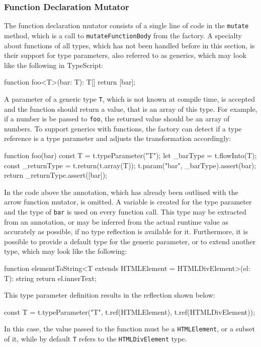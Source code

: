 \subsubsection{Function Declaration Mutator}

The function declaration mutator consists of a single line of code in the \texttt{mutate} method, which is a call to \texttt{mutateFunctionBody} from the factory. A specialty about functions of all types, which has not been handled before in this section, is their support for type parameters, also referred to as generics, which may look like the following in TypeScript:
\begin{JsCode}[numbers=none]
function foo<T>(bar: T): T[] {
  return [bar];
}
\end{JsCode}
A parameter of a generic type \texttt{T}, which is not known at compile time, is accepted and the function should return a value, that is an array of this type. For example, if a number is be passed to \texttt{foo}, the returned value should be an array of numbers. To support generics with functions, the factory can detect if a type reference is a type parameter and adjusts the transformation accordingly:
\begin{JsCode}[numbers=none]
function foo(bar) {
    const T = t.typeParameter("T");
    let _barType = t.flowInto(T);
    const _returnType = t.return(t.array(T));
    t.param("bar", _barType).assert(bar);
    return _returnType.assert([bar]);
}
\end{JsCode}
In the code above the annotation, which has already been outlined with the arrow function mutator, is omitted. A variable is created for the type parameter and the type of \texttt{bar} is used on every function call. This type may be extracted from an annotation, or may be inferred from the actual runtime value as accurately as possible, if no type reflection is available for it. Furthermore, it is possible to provide a default type for the generic parameter, or to extend another type, which may look like the following:
\begin{JsCode}[numbers=none]
function elementToString<T extends HTMLElement = HTMLDivElement>(el: T): string {
  return el.innerText;
}
\end{JsCode}
This type parameter definition results in the reflection shown below:
\begin{JsCode}[numbers=none]
const T = t.typeParameter("T", t.ref(HTMLElement), t.ref(HTMLDivElement));
\end{JsCode}
In this case, the value passed to the function must be a \texttt{HTMLElement}, or a subset of it, while by default \texttt{T} refers to the \texttt{HTMLDivElement} type.


